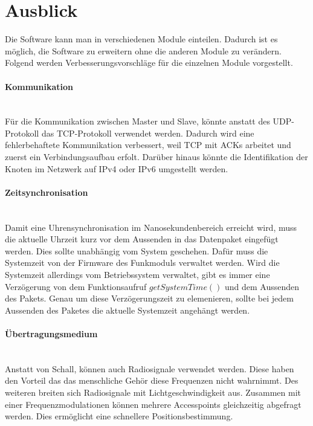 \newpage

\section{Ausblick}
Die Software kann man in verschiedenen Module einteilen. Dadurch ist es möglich, die Software zu erweitern ohne die anderen Module zu verändern. Folgend werden Verbesserungsvorschläge für die einzelnen Module vorgestellt.

\paragraph{Kommunikation}\mbox{}\\
Für die Kommunikation zwischen Master und Slave, könnte anstatt des UDP-Protokoll das TCP-Protokoll verwendet werden. Dadurch wird eine fehlerbehaftete Kommunikation verbessert, weil TCP mit ACKs arbeitet und zuerst ein Verbindungsaufbau erfolt. Darüber hinaus könnte die Identifikation der Knoten im Netzwerk auf IPv4 oder IPv6 umgestellt werden.

\paragraph{Zeitsynchronisation}\mbox{}\\
Damit eine Uhrensynchronisation im Nanosekundenbereich erreicht wird, muss die aktuelle Uhrzeit kurz vor dem Aussenden in das Datenpaket eingefügt werden. Dies sollte unabhängig vom System geschehen. Dafür muss die Systemzeit von der Firmware des Funkmoduls verwaltet werden. Wird die Systemzeit allerdings vom Betriebssystem verwaltet, gibt es immer eine Verzögerung von dem Funktionsaufruf $getSystemTime()$ und dem Aussenden des Pakets. Genau um diese Verzögerungszeit zu elemenieren, sollte bei jedem Aussenden des Paketes die aktuelle Systemzeit angehängt werden.

\paragraph{Übertragungsmedium}\mbox{}\\
Anstatt von Schall, können auch Radiosignale verwendet werden. Diese haben den Vorteil das das menschliche Gehör diese Frequenzen nicht wahrnimmt. Des weiteren breiten sich Radiosignale mit Lichtgeschwindigkeit aus. Zusammen mit einer Frequenzmodulationen können mehrere Accesspoints gleichzeitig abgefragt werden. Dies ermöglicht eine schnellere Positionsbestimmung.

